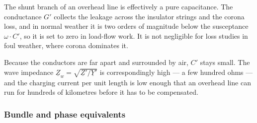 The shunt branch of an overhead line is effectively a pure capacitance. The
conductance $G'$ collects the leakage across the insulator strings and the
corona loss, and in normal weather it is two orders of magnitude below the
susceptance $\omega \cdot C'$, so it is set to zero in load-flow work. It is
not negligible for loss studies in foul weather, where corona dominates it.

Because the conductors are far apart and surrounded by air, $C'$ stays
small. The wave impedance $\underline{Z}_w = \sqrt{\underline{Z}' /
\underline{Y}'}$ is correspondingly high --- a few hundred ohms --- and the
charging current per unit length is low enough that an overhead line can run
for hundreds of kilometres before it has to be compensated.

\subsubsection{Bundle and phase equivalents}
\label{sec:ohl-bundle}

